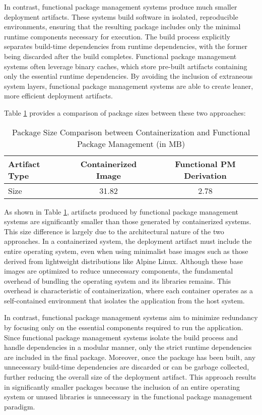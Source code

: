 In contrast, functional package management systems produce much smaller deployment artifacts.
These systems build software in isolated, reproducible environments, ensuring that the
resulting package includes only the minimal runtime components necessary for execution. The
build process explicitly separates build-time dependencies from runtime dependencies, with
the former being discarded after the build completes. Functional package management systems
often leverage binary caches, which store pre-built artifacts containing only the essential
runtime dependencies. By avoiding the inclusion of extraneous system layers, functional
package management systems are able to create leaner, more efficient deployment artifacts.

Table \ref{tab:package_size} provides a comparison of package sizes between these two
approaches:

\begin{table}[H]
	\centering
	\caption{Package Size Comparison between Containerization and Functional Package Management (in MB)}
	\label{tab:package_size}
	\begin{tabular}{|l|c|c|}
		\hline
		\textbf{Artifact Type} & \textbf{Containerized Image} & \textbf{Functional PM Derivation} \\
		\hline
		Size                   & 31.82                        & 2.78                              \\
		\hline
	\end{tabular}
\end{table}

As shown in Table \ref{tab:package_size}, artifacts produced by functional package management
systems are significantly smaller than those generated by containerized systems. This size
difference is largely due to the architectural nature of the two approaches. In a containerized
system, the deployment artifact must include the entire operating system, even when using
minimalist base images such as those derived from lightweight distributions like Alpine Linux.
Although these base images are optimized to reduce unnecessary components, the fundamental
overhead of bundling the operating system and its libraries remains. This overhead is
characteristic of containerization, where each container operates as a self-contained
environment that isolates the application from the host system.

In contrast, functional package management systems aim to minimize redundancy by focusing
only on the essential components required to run the application. Since functional package
management systems isolate the build process and handle dependencies in a modular manner,
only the strict runtime dependencies are included in the final package. Moreover, once the
package has been built, any unnecessary build-time dependencies are discarded or can be
garbage collected, further reducing the overall size of the deployment artifact. This approach
results in significantly smaller packages because the inclusion of an entire operating system
or unused libraries is unnecessary in the functional package management paradigm.

